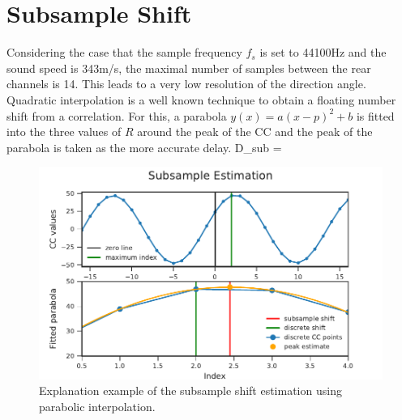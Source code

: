\section{Subsample Shift}
\label{sec:02_subsampleShift}

Considering the case that the sample frequency $f_s$ is set to 44100\si{Hz}
and the sound speed is 343\si{m/s}, the maximal number of samples
between the rear channels is 14.
This leads to a very low resolution of the direction angle.
Quadratic interpolation is a well known technique to obtain a floating number
shift from a correlation.
For this, a parabola $y(x) = a(x-p)^2+b$ is fitted into the three values of $R$ around the peak
of the \ac{CC} and the peak of the parabola is taken as the more accurate
delay.
\bal
	D_{sub} = \frac{\alpha - \gamma}{2 \cdot (\alpha - 2\beta + \gamma)}
	\label{eq:02_subsample}
\eal
\begin{figure}[ht]
	\centering
		\includegraphics[]{figures/subsample_shift}
	\caption{Explanation example of the subsample shift estimation using parabolic interpolation.}
    \label{fig:02_subsampleShift}
\end{figure}
